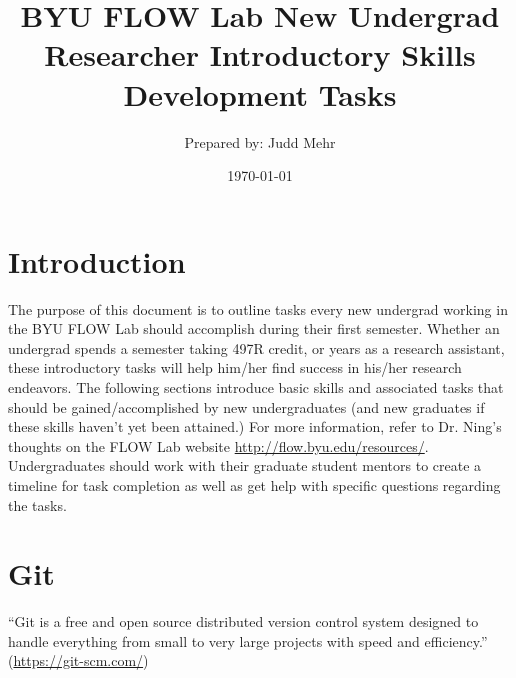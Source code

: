 \documentclass[]{article}%
\title{BYU FLOW Lab New Undergrad Researcher Introductory Skills Development Tasks}
\author{Prepared by: Judd Mehr}
\date{\today} %
\begin{document}
\maketitle 

\section{Introduction}
The purpose of this document is to outline tasks every new undergrad working in the BYU FLOW Lab should accomplish during their first semester.   Whether an undergrad spends a semester taking 497R credit, or years as a research assistant, these introductory tasks will help him/her find success in his/her research endeavors. The following sections introduce basic skills and associated tasks that should be gained/accomplished by new undergraduates (and new graduates if these skills haven't yet been attained.)  For more information, refer to Dr. Ning's thoughts on the FLOW Lab website \url{http://flow.byu.edu/resources/}.  Undergraduates should work with their graduate student mentors to create a timeline for task completion as well as get help with specific questions regarding the tasks.



\section{Git}
``Git is a free and open source distributed version control system designed to handle everything from small to very large projects with speed and efficiency.'' (\url{https://git-scm.com/})
\end{document}
